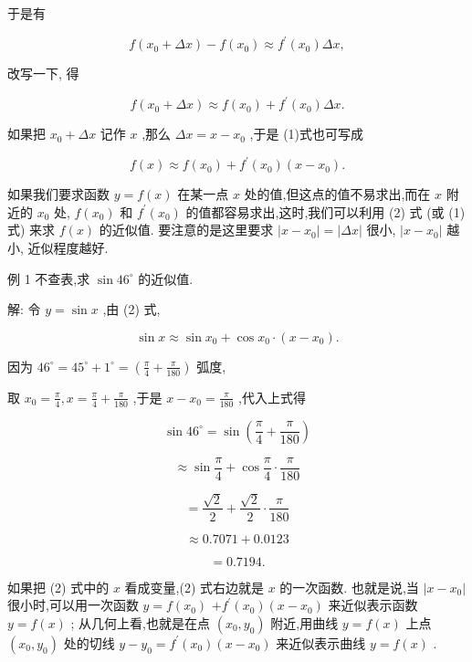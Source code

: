 \documentclass[lang=cn,newtx,12pt,scheme=chinese]{elegantbook}
\begin{document}
于是有

\[
f\left( {{x}_{0} + {\Delta x}}\right) - f\left( {x}_{0}\right) \approx {f}^{\prime }\left( {x}_{0}\right) {\Delta x},
\]

改写一下, 得

\[
f\left( {{x}_{0} + {\Delta x}}\right) \approx f\left( {x}_{0}\right) + {f}^{\prime }\left( {x}_{0}\right) {\Delta x}. \tag{1}
\]

如果把 \({x}_{0} + {\Delta x}\) 记作 \(x\) ,那么 \({\Delta x} = x - {x}_{0}\) ,于是 (1)式也可写成

\[
f\left( x\right) \approx f\left( {x}_{0}\right) + {f}^{\prime }\left( {x}_{0}\right) \left( {x - {x}_{0}}\right) . \tag{2}
\]

如果我们要求函数 \(y = f\left( x\right)\) 在某一点 \(x\) 处的值,但这点的值不易求出,而在 \(x\) 附近的 \({x}_{0}\) 处, \(f\left( {x}_{0}\right)\) 和 \({f}^{\prime }\left( {x}_{0}\right)\) 的值都容易求出,这时,我们可以利用 (2) 式 (或 (1) 式) 来求 \(f\left( x\right)\) 的近似值. 要注意的是这里要求 \(\left| {x - {x}_{0}}\right| = \left| {\Delta x}\right|\) 很小, \(\left| {x - {x}_{0}}\right|\) 越小, 近似程度越好.

例 1 不查表,求 \(\sin {46}^{ \circ }\) 的近似值.

解: 令 \(y = \sin x\) ,由 (2) 式,

\[
\sin x \approx \sin {x}_{0} + \cos {x}_{0} \cdot \left( {x - {x}_{0}}\right) .
\]

因为 \({46}^{ \circ } = {45}^{ \circ } + {1}^{ \circ } = \left( {\frac{\pi }{4} + \frac{\pi }{180}}\right)\) 弧度,

取 \({x}_{0} = \frac{\pi }{4},x = \frac{\pi }{4} + \frac{\pi }{180}\) ,于是 \(x - {x}_{0} = \frac{\pi }{180}\) ,代入上式得

\[
\sin {46}^{ \circ } = \sin \left( {\frac{\pi }{4} + \frac{\pi }{180}}\right)
\]

\[
\approx \sin \frac{\pi }{4} + \cos \frac{\pi }{4} \cdot \frac{\pi }{180}
\]

\[
= \frac{\sqrt{2}}{2} + \frac{\sqrt{2}}{2} \cdot \frac{\pi }{180}
\]

\[
\approx {0.7071} + {0.0123}
\]

\[
= {0.7194}\text{.}
\]

如果把 (2) 式中的 \(x\) 看成变量,(2) 式右边就是 \(x\) 的一次函数. 也就是说,当 \(\left| {x - {x}_{0}}\right|\) 很小时,可以用一次函数 \(y = f\left( {x}_{0}\right)\) \(+ {f}^{\prime }\left( {x}_{0}\right) \left( {x - {x}_{0}}\right)\) 来近似表示函数 \(y = f\left( x\right)\) ; 从几何上看,也就是在点 \(\left( {{x}_{0},{y}_{0}}\right)\) 附近,用曲线 \(y = f\left( x\right)\) 上点 \(\left( {{x}_{0},{y}_{0}}\right)\) 处的切线 \(y - {y}_{0} = {f}^{\prime }\left( {x}_{0}\right) \left( {x - {x}_{0}}\right)\) 来近似表示曲线 \(y = f\left( x\right)\) .
\end{document}
